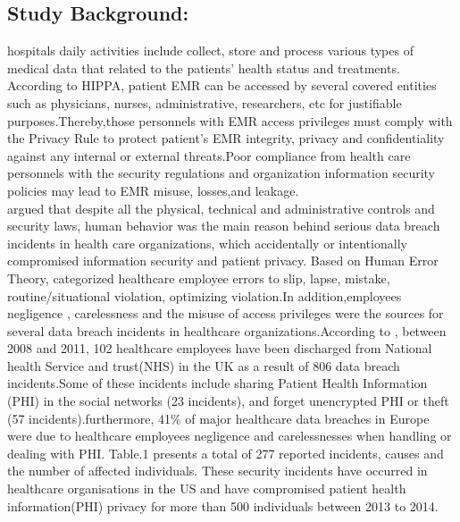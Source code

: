 \subsection{Study Background:}

hospitals daily activities include collect, store and process various types of medical data that related to the patients' health status and treatments. According to HIPPA, patient EMR can be accessed by several covered entities such as physicians, nurses, administrative, researchers, etc for justifiable purposes.Thereby,those personnels with EMR access privileges must comply with the Privacy Rule to protect patient's EMR integrity, privacy and confidentiality against any internal or external threats.Poor compliance from health care personnels with the security regulations and organization information security policies may 
lead to EMR misuse, losses,and leakage.\\
\citet{Kamoun} argued that despite all the physical, technical and administrative controls and security laws, human behavior was the main reason behind serious data breach incidents in health care organizations, which accidentally or intentionally compromised information security and patient privacy. Based on Human Error Theory,\citet{Kamoun} categorized  healthcare employee errors to slip, lapse, mistake, routine/situational violation, optimizing violation.In addition,employees negligence , carelessness and the misuse of access privileges were the sources for several data breach incidents in healthcare organizations.According to \cite{Kamoun}, between 2008 and 2011, 102 healthcare employees have been discharged from National health Service and trust(NHS) in the UK as a result of 806 data breach incidents.Some of these incidents include sharing Patient Health Information (PHI) in the social networks (23 incidents), and forget unencrypted PHI or theft (57 incidents).furthermore, 41\% of major healthcare data breaches in Europe were due to healthcare employees  negligence and carelessnesses when handling or dealing with PHI\cite{Kierkegaard2012,Kamoun}. Table.1 presents a total of 277 reported incidents, causes and the number of affected individuals. These security incidents have occurred in healthcare organisations in the US and have compromised patient health information(PHI) privacy for more than 500 individuals between 2013 to 2014.
\graphicspath{ {image/} }
